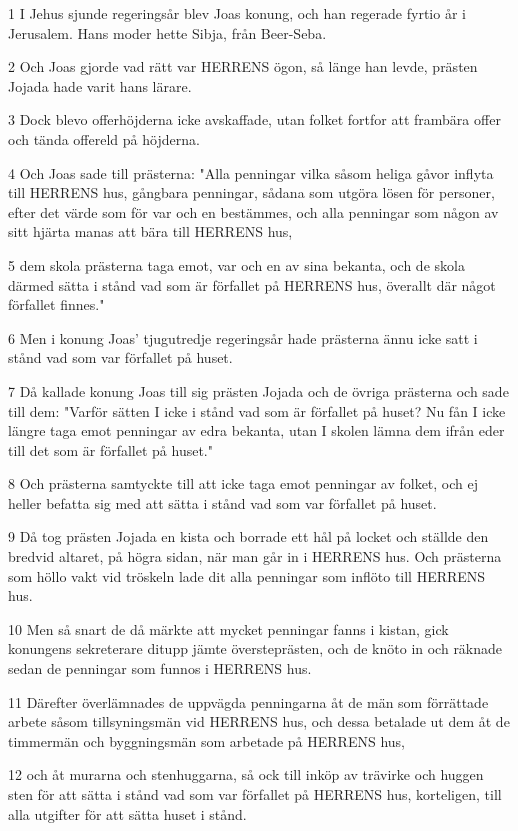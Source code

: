 \par 1 I Jehus sjunde regeringsår blev Joas konung, och han regerade fyrtio år i Jerusalem. Hans moder hette Sibja, från Beer-Seba.
\par 2 Och Joas gjorde vad rätt var HERRENS ögon, så länge han levde, prästen Jojada hade varit hans lärare.
\par 3 Dock blevo offerhöjderna icke avskaffade, utan folket fortfor att frambära offer och tända offereld på höjderna.
\par 4 Och Joas sade till prästerna: "Alla penningar vilka såsom heliga gåvor inflyta till HERRENS hus, gångbara penningar, sådana som utgöra lösen för personer, efter det värde som för var och en bestämmes, och alla penningar som någon av sitt hjärta manas att bära till HERRENS hus,
\par 5 dem skola prästerna taga emot, var och en av sina bekanta, och de skola därmed sätta i stånd vad som är förfallet på HERRENS hus, överallt där något förfallet finnes."
\par 6 Men i konung Joas' tjugutredje regeringsår hade prästerna ännu icke satt i stånd vad som var förfallet på huset.
\par 7 Då kallade konung Joas till sig prästen Jojada och de övriga prästerna och sade till dem: "Varför sätten I icke i stånd vad som är förfallet på huset? Nu fån I icke längre taga emot penningar av edra bekanta, utan I skolen lämna dem ifrån eder till det som är förfallet på huset."
\par 8 Och prästerna samtyckte till att icke taga emot penningar av folket, och ej heller befatta sig med att sätta i stånd vad som var förfallet på huset.
\par 9 Då tog prästen Jojada en kista och borrade ett hål på locket och ställde den bredvid altaret, på högra sidan, när man går in i HERRENS hus. Och prästerna som höllo vakt vid tröskeln lade dit alla penningar som inflöto till HERRENS hus.
\par 10 Men så snart de då märkte att mycket penningar fanns i kistan, gick konungens sekreterare ditupp jämte översteprästen, och de knöto in och räknade sedan de penningar som funnos i HERRENS hus.
\par 11 Därefter överlämnades de uppvägda penningarna åt de män som förrättade arbete såsom tillsyningsmän vid HERRENS hus, och dessa betalade ut dem åt de timmermän och byggningsmän som arbetade på HERRENS hus,
\par 12 och åt murarna och stenhuggarna, så ock till inköp av trävirke och huggen sten för att sätta i stånd vad som var förfallet på HERRENS hus, korteligen, till alla utgifter för att sätta huset i stånd.
